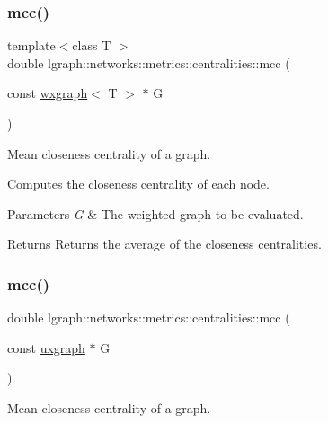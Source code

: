 \subsubsection{\texorpdfstring{mcc()}{mcc()}\hspace{0.1cm}{\footnotesize\ttfamily [1/4]}}
{\footnotesize\ttfamily template$<$class T $>$ \\
double lgraph\+::networks\+::metrics\+::centralities\+::mcc (\begin{DoxyParamCaption}\item[{const \hyperlink{classlgraph_1_1wxgraph}{wxgraph}$<$ T $>$ $\ast$}]{G }\end{DoxyParamCaption})}



Mean closeness centrality of a graph. 

Computes the closeness centrality of each node.


\begin{DoxyParams}{Parameters}
{\em G} & The weighted graph to be evaluated. \\
\hline
\end{DoxyParams}
\begin{DoxyReturn}{Returns}
Returns the average of the closeness centralities. 
\end{DoxyReturn}
\mbox{\label{namespacelgraph_1_1networks_1_1metrics_1_1centralities_a3321a941646c6958c695198b1efcbe13}} 
\subsubsection{\texorpdfstring{mcc()}{mcc()}\hspace{0.1cm}{\footnotesize\ttfamily [2/4]}}
{\footnotesize\ttfamily double lgraph\+::networks\+::metrics\+::centralities\+::mcc (\begin{DoxyParamCaption}\item[{const \hyperlink{classlgraph_1_1uxgraph}{uxgraph} $\ast$}]{G }\end{DoxyParamCaption})}



Mean closeness centrality of a graph. 

